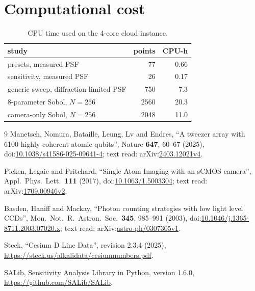 \documentclass[11pt,a4paper]{article}
\begin{document}
\section{Computational cost}

\begin{table}[H]
\centering
\caption{CPU time used on the 4-core cloud instance.}
\label{tab:cost}
\small
\begin{tabular}{@{}l r r@{}}
\toprule
study & points & CPU-h \\
\midrule
presets, measured PSF & 77 & 0.66 \\
sensitivity, measured PSF & 26 & 0.17 \\
generic sweep, diffraction-limited PSF & 750 & 7.3 \\
8-parameter Sobol, $N = 256$ & 2560 & 20.3 \\
camera-only Sobol, $N = 256$ & 2048 & 11.0 \\
\bottomrule
\end{tabular}
\end{table}

\FloatBarrier
\begin{thebibliography}{9}
Manetsch, Nomura, Bataille, Leung, Lv and Endres,
``A tweezer array with 6100 highly coherent atomic qubits'',
Nature \textbf{647}, 60--67 (2025), doi:\href{https://doi.org/10.1038/s41586-025-09641-4}{10.1038/s41586-025-09641-4};
text read: arXiv:\href{https://arxiv.org/abs/2403.12021v4}{2403.12021v4}.

Picken, Legaie and Pritchard,
``Single Atom Imaging with an sCMOS camera'',
Appl.\ Phys.\ Lett.\ \textbf{111} (2017), doi:\href{https://doi.org/10.1063/1.5003304}{10.1063/1.5003304};
text read: arXiv:\href{https://arxiv.org/abs/1709.00946v2}{1709.00946v2}.

Basden, Haniff and Mackay,
``Photon counting strategies with low light level CCDs'',
Mon.\ Not.\ R.\ Astron.\ Soc.\ \textbf{345}, 985--991 (2003),
doi:\href{https://doi.org/10.1046/j.1365-8711.2003.07020.x}{10.1046/j.1365-8711.2003.07020.x};
text read: arXiv:\href{https://arxiv.org/abs/astro-ph/0307305v1}{astro-ph/0307305v1}.

Steck, ``Cesium D Line Data'', revision 2.3.4 (2025),
\url{https://steck.us/alkalidata/cesiumnumbers.pdf}.

SALib, Sensitivity Analysis Library in Python, version 1.6.0, \url{https://github.com/SALib/SALib}.
\end{thebibliography}
\end{document}

